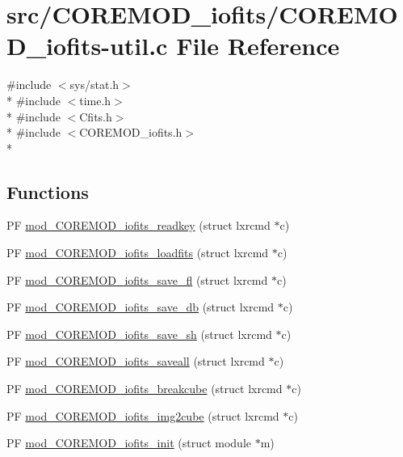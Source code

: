 \hypertarget{COREMOD__iofits-util_8c}{\section{src/\+C\+O\+R\+E\+M\+O\+D\+\_\+iofits/\+C\+O\+R\+E\+M\+O\+D\+\_\+iofits-\/util.c File Reference}
\label{COREMOD__iofits-util_8c}
}
{\ttfamily \#include $<$sys/stat.\+h$>$}\\*
{\ttfamily \#include $<$time.\+h$>$}\\*
{\ttfamily \#include $<$Cfits.\+h$>$}\\*
{\ttfamily \#include $<$C\+O\+R\+E\+M\+O\+D\+\_\+iofits.\+h$>$}\\*
\subsection*{Functions}
\begin{DoxyCompactItemize}
\item 
P\+F \hyperlink{COREMOD__iofits-util_8c_aeb9dca3f78d29aea5c3a6995ec867ad0}{mod\+\_\+\+C\+O\+R\+E\+M\+O\+D\+\_\+iofits\+\_\+readkey} (struct lxrcmd $\ast$c)
\item 
P\+F \hyperlink{COREMOD__iofits-util_8c_a625ce3b17195d8e08f4319e4a6cac82d}{mod\+\_\+\+C\+O\+R\+E\+M\+O\+D\+\_\+iofits\+\_\+loadfits} (struct lxrcmd $\ast$c)
\item 
P\+F \hyperlink{COREMOD__iofits-util_8c_afa228e6c874d72f2e486870e0f27a76a}{mod\+\_\+\+C\+O\+R\+E\+M\+O\+D\+\_\+iofits\+\_\+save\+\_\+fl} (struct lxrcmd $\ast$c)
\item 
P\+F \hyperlink{COREMOD__iofits-util_8c_a3402a7c6e69aeae45f321efec080c91a}{mod\+\_\+\+C\+O\+R\+E\+M\+O\+D\+\_\+iofits\+\_\+save\+\_\+db} (struct lxrcmd $\ast$c)
\item 
P\+F \hyperlink{COREMOD__iofits-util_8c_a24e6f737b66283cfc8d8a2fa2e109e9c}{mod\+\_\+\+C\+O\+R\+E\+M\+O\+D\+\_\+iofits\+\_\+save\+\_\+sh} (struct lxrcmd $\ast$c)
\item 
P\+F \hyperlink{COREMOD__iofits-util_8c_a9edb0bb8746624d5e245d460f334e3ec}{mod\+\_\+\+C\+O\+R\+E\+M\+O\+D\+\_\+iofits\+\_\+saveall} (struct lxrcmd $\ast$c)
\item 
P\+F \hyperlink{COREMOD__iofits-util_8c_a651d22cbf69a99c25e305e370a5fed25}{mod\+\_\+\+C\+O\+R\+E\+M\+O\+D\+\_\+iofits\+\_\+breakcube} (struct lxrcmd $\ast$c)
\item 
P\+F \hyperlink{COREMOD__iofits-util_8c_a3b242840565361a6f520bab50325e4f5}{mod\+\_\+\+C\+O\+R\+E\+M\+O\+D\+\_\+iofits\+\_\+img2cube} (struct lxrcmd $\ast$c)
\item 
P\+F \hyperlink{COREMOD__iofits-util_8c_a41c5c637eb88eb38eff072058b58e0e5}{mod\+\_\+\+C\+O\+R\+E\+M\+O\+D\+\_\+iofits\+\_\+init} (struct module $\ast$m)
\end{DoxyCompactItemize}
